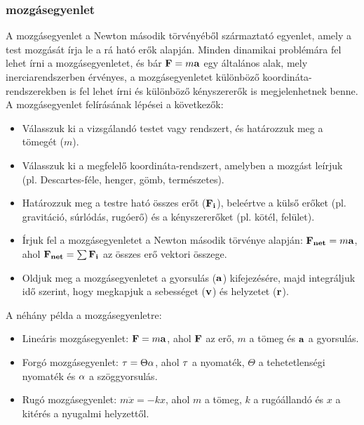 \documentclass[a4paper,12pt]{article}
\begin{document}
\subsubsection{mozgásegyenlet}
A mozgásegyenlet a Newton második törvényéből származtató egyenlet, amely a test mozgását írja le a rá ható erők alapján. Minden dinamikai problémára fel lehet írni a mozgásegyenletet, és bár $\bold{F} = m\bold{a}$ egy általános alak, mely inerciarendszerben érvényes,
a mozgásegyenletet különböző koordináta-rendszerekben is fel lehet írni és különböző kényszererők is megjelenhetnek benne. A mozgásegyenlet felírásának lépései a következők:
\begin{itemize}
    \item Válasszuk ki a vizsgálandó testet vagy rendszert, és határozzuk meg a tömegét ($m$).
    \item Válasszuk ki a megfelelő koordináta-rendszert, amelyben a mozgást leírjuk (pl. Descartes-féle, henger, gömb, természetes).
    \item Határozzuk meg a testre ható összes erőt ($\bold{F_i}$), beleértve a külső erőket (pl. gravitáció, súrlódás, rugóerő) és a kényszererőket (pl. kötél, felület).
    \item Írjuk fel a mozgásegyenletet a Newton második törvénye alapján: $\bold{F_{net}} = m\bold{a}$, ahol $\bold{F_{net}} = \sum \bold{F_i}$ az összes erő vektori összege.
    \item Oldjuk meg a mozgásegyenletet a gyorsulás ($\bold{a}$) kifejezésére, majd integráljuk idő szerint, hogy megkapjuk a sebességet ($\bold{v}$) és helyzetet ($\bold{r}$).
\end{itemize}
A néhány példa a mozgásegyenletre:
\begin{itemize}
    \item Lineáris mozgásegyenlet: $\bold{F} = m\bold{a}$, ahol $\bold{F}$ az erő, $m$ a tömeg és $\bold{a}$ a gyorsulás.
    \item Forgó mozgásegyenlet: $\bold{\tau} = \Theta\bold{\alpha}$, ahol $\bold{\tau}$ a nyomaték, $\Theta$ a tehetetlenségi nyomaték és $\bold{\alpha}$ a szöggyorsulás.
    \item Rugó mozgásegyenlet: $m\ddot{x} = -kx$, ahol $m$ a tömeg, $k$ a rugóállandó és $x$ a kitérés a nyugalmi helyzettől.
\end{itemize}
\end{document}
